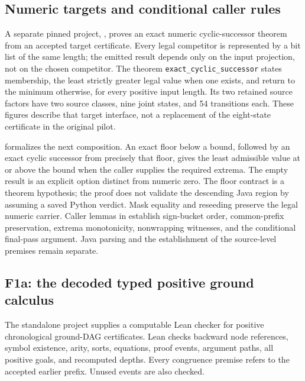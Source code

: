 \subsection{Numeric targets and conditional caller rules}
A separate pinned project, , proves an exact numeric cyclic-successor theorem from an accepted target certificate. Every legal competitor is represented by a bit list of the same length; the emitted result depends only on the input projection, not on the chosen competitor. The theorem \texttt{exact\_cyclic\_successor} states membership, the least strictly greater legal value when one exists, and return to the minimum otherwise, for every positive input length. Its two retained source factors have two source classes, nine joint states, and 54 transitions each. These figures describe that target interface, not a replacement of the eight-state certificate in the original pilot.

 formalizes the next composition. An exact floor below a bound, followed by an exact cyclic successor from precisely that floor, gives the least admissible value at or above the bound when the caller supplies the required extrema. The empty result is an explicit option distinct from numeric zero. The floor contract is a theorem hypothesis; the proof does not validate the descending Java region by assuming a saved Python verdict. Mask equality and reseeding preserve the legal numeric carrier. Caller lemmas in  establish sign-bucket order, common-prefix preservation, extrema monotonicity, nonwrapping witnesses, and the conditional final-pass argument. Java parsing and the establishment of the source-level premises remain separate.

\subsection{F1a: the decoded typed positive ground calculus}
The standalone project  supplies a computable Lean checker for positive chronological ground-DAG certificates. Lean checks backward node references, symbol existence, arity, sorts, equations, proof events, argument paths, all positive goals, and recomputed depths. Every congruence premise refers to the accepted earlier prefix. Unused events are also checked.

